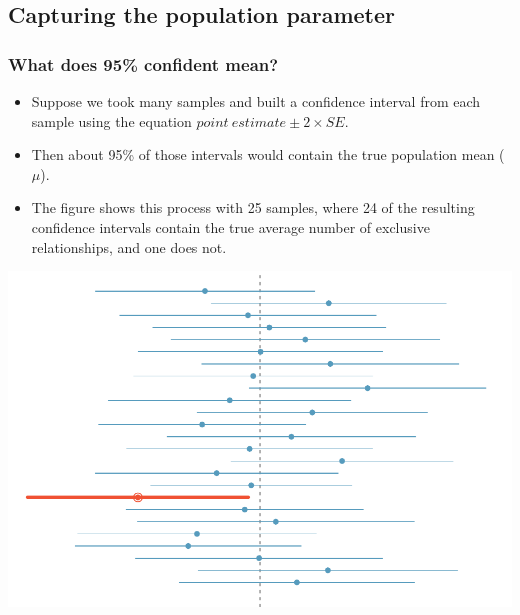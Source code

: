 
\subsection{Capturing the population parameter}


\begin{frame}
\frametitle{What does 95\% confident mean?}

\begin{itemize}

\item Suppose we took many samples and built a confidence interval from each sample using the equation $point~estimate \pm 2 \times SE$.

\item Then about 95\% of those intervals would contain the true population mean ($\mu$). 

\end{itemize}

{
\begin{itemize}

\item The figure shows this process with 25 samples, where 24 of the resulting confidence intervals contain the true average number of exclusive relationships, and one does not.

\end{itemize}
}
{
\includegraphics[width=\textwidth]{5-2_conf_int/figures/95PercentConfidenceInterval/95PercentConfidenceInterval}
}

\end{frame}

